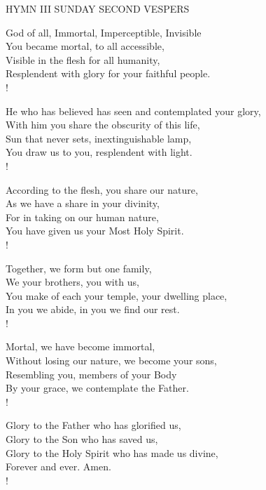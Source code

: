 \noindent\small{\uppercase{Hymn III SUNDAY Second Vespers}}\normalsize\label{ordinaryTime:thirdHymn}
\begin{cverse}
God of all, Immortal, Imperceptible, Invisible\\
You became mortal, to all accessible,\\
Visible in the flesh for all humanity,\\
Resplendent with glory for your faithful people.\\!

He who has believed has seen and contemplated your glory,\\
With him you share the obscurity of this life,\\
Sun that never sets, inextinguishable lamp,\\
You draw us to you, resplendent with light.\\!

According to the flesh, you share our nature,\\
As we have a share in your divinity,\\
For in taking on our human nature,\\
You have given us your Most Holy Spirit.\\!

Together, we form but one family,\\
We your brothers, you with us,\\
You make of each your temple, your dwelling place,\\
In you we abide, in you we find our rest.\\!

Mortal, we have become immortal,\\
Without losing our nature, we become your sons,\\
Resembling you, members of your Body\\
By your grace, we contemplate the Father.\\!

Glory to the Father who has glorified us,\\
Glory to the Son who has saved us,\\
Glory to the Holy Spirit who has made us divine,\\
Forever and ever. Amen.\\!
\end{cverse}

